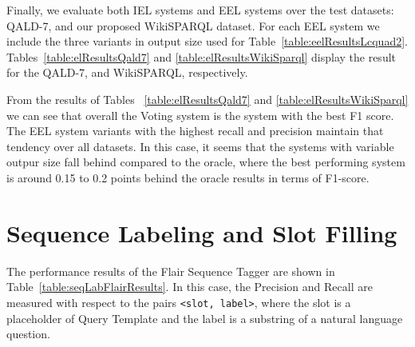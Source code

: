 Finally, we evaluate both IEL systems and EEL systems over the test datasets: QALD-7, and our 
proposed WikiSPARQL dataset. For each EEL system we include the three variants in output size
used for Table~\ref{table:eelResultsLcquad2}. Tables~\ref{table:elResultsQald7} and \ref{table:elResultsWikiSparql} 
display the result for the QALD-7, and WikiSPARQL, respectively.

From the results of Tables ~\ref{table:elResultsQald7} and \ref{table:elResultsWikiSparql} we can 
see that overall the Voting system is the system with the best F1 score. The EEL system variants 
with the highest recall and precision maintain that tendency over all datasets. In this case, it 
seems that the systems with variable outpur size fall behind compared to the oracle, where the 
best performing system is around 0.15 to 0.2 points behind the oracle results in terms of F1-score. 

\section{Sequence Labeling and Slot Filling}
\label{cap5:results/seqLabSlotFilling}

The performance results of the Flair Sequence Tagger are shown in Table~\ref{table:seqLabFlairResults}. 
In this case, the Precision and Recall are measured with respect to the pairs \texttt{<slot, label>}, 
where the slot is a placeholder of Query Template and the label is a substring of a natural 
language question.

